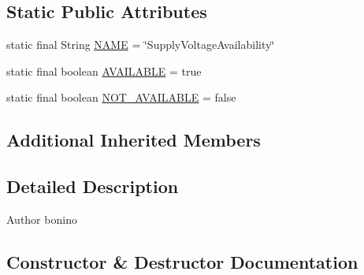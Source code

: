 \subsection*{Static Public Attributes}
\begin{DoxyCompactItemize}
\item 
static final String \hyperlink{classit_1_1polito_1_1elite_1_1enocean_1_1enj_1_1eep_1_1eep26_1_1attributes_1_1_e_e_p26_supply_voltage_availability_aab825ee9b6389fc21ac4a1c5a462a460}{N\+A\+ME} = \char`\"{}Supply\+Voltage\+Availability\char`\"{}
\item 
static final boolean \hyperlink{classit_1_1polito_1_1elite_1_1enocean_1_1enj_1_1eep_1_1eep26_1_1attributes_1_1_e_e_p26_supply_voltage_availability_aa00b01911c25062929258e7f6f2b856e}{A\+V\+A\+I\+L\+A\+B\+LE} = true
\item 
static final boolean \hyperlink{classit_1_1polito_1_1elite_1_1enocean_1_1enj_1_1eep_1_1eep26_1_1attributes_1_1_e_e_p26_supply_voltage_availability_af7c8a33234b0391bf983572b8f6c6de3}{N\+O\+T\+\_\+\+A\+V\+A\+I\+L\+A\+B\+LE} = false
\end{DoxyCompactItemize}
\subsection*{Additional Inherited Members}


\subsection{Detailed Description}
\begin{DoxyAuthor}{Author}
bonino 
\end{DoxyAuthor}


\subsection{Constructor \& Destructor Documentation}
\hypertarget{classit_1_1polito_1_1elite_1_1enocean_1_1enj_1_1eep_1_1eep26_1_1attributes_1_1_e_e_p26_supply_voltage_availability_a319b54a8e9cc8a902ff7d9f7c8e2844f}{}\label{classit_1_1polito_1_1elite_1_1enocean_1_1enj_1_1eep_1_1eep26_1_1attributes_1_1_e_e_p26_supply_voltage_availability_a319b54a8e9cc8a902ff7d9f7c8e2844f} 
